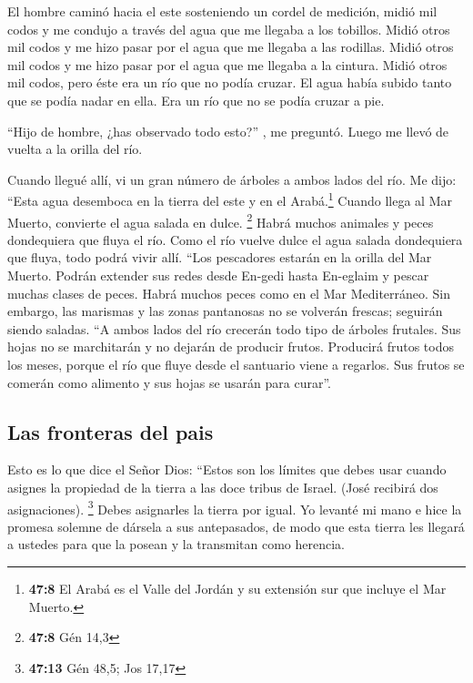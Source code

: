  El hombre caminó hacia el este sosteniendo un cordel de
medición, midió mil codos y me condujo a través del agua que me llegaba
a los tobillos.  Midió otros mil codos y me hizo pasar por
el agua que me llegaba a las rodillas. Midió otros mil codos y me hizo
pasar por el agua que me llegaba a la cintura.  Midió
otros mil codos, pero éste era un río que no podía cruzar. El agua había
subido tanto que se podía nadar en ella. Era un río que no se podía
cruzar a pie.

 ``Hijo de hombre, ¿has observado todo esto?'' , me
preguntó. Luego me llevó de vuelta a la orilla del río.

 Cuando llegué allí, vi un gran número de árboles a ambos
lados del río.  Me dijo: ``Esta agua desemboca en la
tierra del este y en el Arabá.\footnote{\textbf{47:8} El Arabá es el
  Valle del Jordán y su extensión sur que incluye el Mar Muerto.} Cuando
llega al Mar Muerto, convierte el agua salada en dulce. \footnote{\textbf{47:8}
  Gén 14,3}  Habrá muchos animales y peces dondequiera que
fluya el río. Como el río vuelve dulce el agua salada dondequiera que
fluya, todo podrá vivir allí.  ``Los pescadores estarán
en la orilla del Mar Muerto. Podrán extender sus redes desde En-gedi
hasta En-eglaim y pescar muchas clases de peces. Habrá muchos peces como
en el Mar Mediterráneo.  Sin embargo, las marismas y las
zonas pantanosas no se volverán frescas; seguirán siendo saladas.
 ``A ambos lados del río crecerán todo tipo de árboles
frutales. Sus hojas no se marchitarán y no dejarán de producir frutos.
Producirá frutos todos los meses, porque el río que fluye desde el
santuario viene a regarlos. Sus frutos se comerán como alimento y sus
hojas se usarán para curar''.

\hypertarget{las-fronteras-del-pais}{%
\subsection{Las fronteras del pais}\label{las-fronteras-del-pais}}

 Esto es lo que dice el Señor Dios: ``Estos son los
límites que debes usar cuando asignes la propiedad de la tierra a las
doce tribus de Israel. (José recibirá dos asignaciones). \footnote{\textbf{47:13}
  Gén 48,5; Jos 17,17}  Debes asignarles la tierra por
igual. Yo levanté mi mano e hice la promesa solemne de dársela a sus
antepasados, de modo que esta tierra les llegará a ustedes para que la
posean y la transmitan como herencia.

